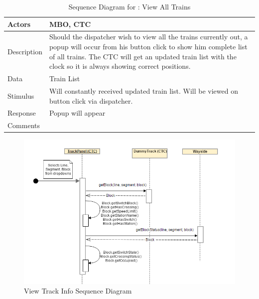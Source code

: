 \documentclass[]{article}
\begin{document}
\begin{table}[H]
	\centering
	\caption{Sequence Diagram for : View All Trains}
	\begin{tabular}{|l|l|}
		\hline
		Actors & \parbox[t]{10cm}{MBO, CTC} \\ \hline
		Description & \parbox[t]{10cm}{Should the dispatcher wish to view all the trains currently out, a popup will occur from his button click to show him complete list of all trains. The CTC will get an updated train list with the clock so it is always showing correct positions. } \\ \hline
		Data &  \parbox[t]{10cm}{Train List} \\ \hline
		Stimulus &  \parbox[t]{10cm}{Will constantly received updated train list. Will be viewed on button click via dispatcher. } \\ \hline
		Response & \parbox[t]{10cm}{Popup will appear}\\ \hline
		Comments & \parbox[t]{10cm}{}  \\ \hline
	\end{tabular}
\end{table}

\begin{figure}[H]
	\centering
	\includegraphics[width=\textwidth]{CTCviewBlock.png}
	\caption{View Track Info Sequence Diagram}
\end{figure}
\end{document}
